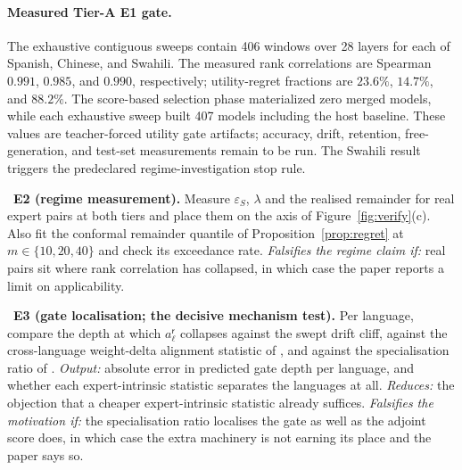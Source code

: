 \documentclass[10pt]{article}
\theoremstyle{plain}
\theoremstyle{definition}
\theoremstyle{remark}
\DeclareRobustCommand{\TORUN}[1]{\par\vspace{2pt}\noindent{\color{resred}\texttt{>>> TO RUN:}}\ #1\par\vspace{2pt}}
\newcommand{\risk}{\mathsf{r}}
\begin{document}
\paragraph{Measured Tier-A E1 gate.}
The exhaustive contiguous sweeps contain 406 windows over 28 layers for each
of Spanish, Chinese, and Swahili. The measured rank correlations are
Spearman $0.991$, $0.985$, and $0.990$, respectively; utility-regret
fractions are $23.6\%$, $14.7\%$, and $88.2\%$. The score-based selection
phase materialized zero merged models, while each exhaustive sweep built 407
models including the host baseline. These values are teacher-forced utility
gate artifacts; accuracy, drift, retention, free-generation, and test-set
measurements remain to be run. The Swahili result triggers the predeclared
regime-investigation stop rule.

\TORUN{\textbf{E2 (regime measurement).} Measure $\varepsilon_S$, $\lambda$ and
the realised remainder for real expert pairs at both tiers and place them on the
axis of Figure~\ref{fig:verify}(c). Also fit the conformal remainder quantile of
Proposition~\ref{prop:regret} at $m\in\{10,20,40\}$ and check its exceedance rate.
\emph{Falsifies the regime claim if:} real pairs sit where rank correlation has
collapsed, in which case the paper reports a limit on applicability.}

\TORUN{\textbf{E3 (gate localisation; the decisive mechanism test).} Per
language, compare the depth at which $a^{\risk}_\ell$ collapses against the swept
drift cliff, against the cross-language weight-delta alignment statistic of
\citet{lasbordes2026rethinking}, and against the specialisation ratio of
\citet{shin2026safetyswap}. \emph{Output:} absolute error in predicted gate depth
per language, and whether each expert-intrinsic statistic separates the
languages at all. \emph{Reduces:} the objection that a cheaper expert-intrinsic
statistic already suffices. \emph{Falsifies the motivation if:} the
specialisation ratio localises the gate as well as the adjoint score does, in
which case the extra machinery is not earning its place and the paper says so.}
\end{document}
